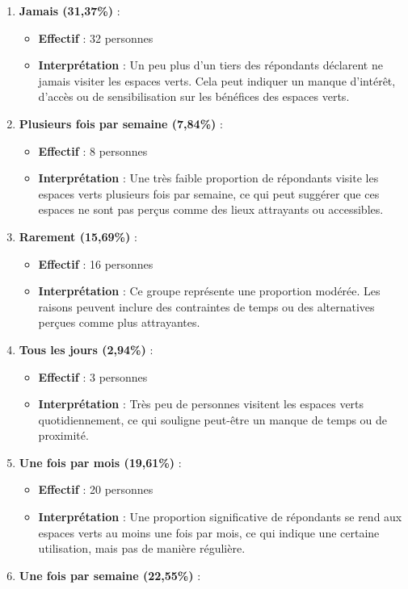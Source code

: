 \documentclass[
]{article}
\providecommand{\tightlist}{%
  \setlength{\itemsep}{0pt}\setlength{\parskip}{0pt}}
\begin{document}
\begin{enumerate}
\def\labelenumi{\arabic{enumi}.}
\tightlist
\item
  \textbf{Jamais (31,37\%)} :

  \begin{itemize}
  \tightlist
  \item
    \textbf{Effectif} : 32 personnes
  \item
    \textbf{Interprétation} : Un peu plus d'un tiers des répondants
    déclarent ne jamais visiter les espaces verts. Cela peut indiquer un
    manque d'intérêt, d'accès ou de sensibilisation sur les bénéfices
    des espaces verts.
  \end{itemize}
\item
  \textbf{Plusieurs fois par semaine (7,84\%)} :

  \begin{itemize}
  \tightlist
  \item
    \textbf{Effectif} : 8 personnes
  \item
    \textbf{Interprétation} : Une très faible proportion de répondants
    visite les espaces verts plusieurs fois par semaine, ce qui peut
    suggérer que ces espaces ne sont pas perçus comme des lieux
    attrayants ou accessibles.
  \end{itemize}
\item
  \textbf{Rarement (15,69\%)} :

  \begin{itemize}
  \tightlist
  \item
    \textbf{Effectif} : 16 personnes
  \item
    \textbf{Interprétation} : Ce groupe représente une proportion
    modérée. Les raisons peuvent inclure des contraintes de temps ou des
    alternatives perçues comme plus attrayantes.
  \end{itemize}
\item
  \textbf{Tous les jours (2,94\%)} :

  \begin{itemize}
  \tightlist
  \item
    \textbf{Effectif} : 3 personnes
  \item
    \textbf{Interprétation} : Très peu de personnes visitent les espaces
    verts quotidiennement, ce qui souligne peut-être un manque de temps
    ou de proximité.
  \end{itemize}
\item
  \textbf{Une fois par mois (19,61\%)} :

  \begin{itemize}
  \tightlist
  \item
    \textbf{Effectif} : 20 personnes
  \item
    \textbf{Interprétation} : Une proportion significative de répondants
    se rend aux espaces verts au moins une fois par mois, ce qui indique
    une certaine utilisation, mais pas de manière régulière.
  \end{itemize}
\item
  \textbf{Une fois par semaine (22,55\%)} :


\end{enumerate}
\end{document}
